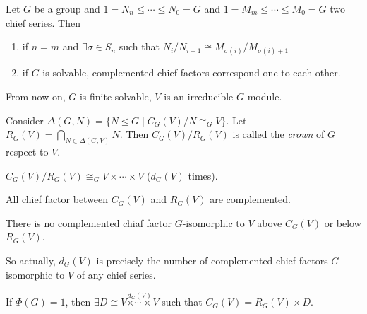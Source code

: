 \documentclass[twoside, 11pt]{article}
\begin{document}
\begin{teorema} Let $G$ be a group and $1=N_n\leq\cdots\leq N_0=G$ and $1=M_m\leq\cdots\leq M_0=G$ two chief series. Then
\begin{enumerate}
\item if $n=m$ and $\exists\sigma\in S_n$ such that $N_i/N_{i+1}\cong M_{\sigma(i)}/M_{\sigma(i)+1}$
\item if $G$ is solvable, complemented chief factors correspond one to each other. 
\end{enumerate} 

\end{teorema}
From now on, $G$ is finite solvable, $V$ is an irreducible $G$-module.

\begin{defi}
Consider $\Delta(G,N)=\{N\trianglelefteq G\mid C_G(V)/N\cong_G V\}$. Let $R_G(V)=\bigcap_{N\in\Delta(G,V)}N$. Then $C_G(V)/R_G(V)$ is called the \emph{crown} of $G$ respect to $V$. 
\end{defi}


\begin{teorema}
$C_G(V)/R_G(V)\cong_G V\times\cdots\times V$ ($d_G(V)$ times). 
\end{teorema}

\begin{teorema}
All chief factor between $C_G(V)$ and $R_G(V)$ are complemented.
\end{teorema}

\begin{teorema}
There is no complemented chiaf factor $G$-isomorphic to $V$ above $C_G(V)$ or below $R_G(V)$. 
\end{teorema}

So actually, $d_G(V)$ is precisely the number of complemented chief factors $G$-isomorphic to $V$ of any chief series.

\begin{teorema}
If $\Phi(G)=1$, then $\exists D\cong V\overset{d_G(V)}{\times\cdots\times}V$ such that $C_G(V)=R_G(V)\times D$. 
\end{teorema}
\end{document}
